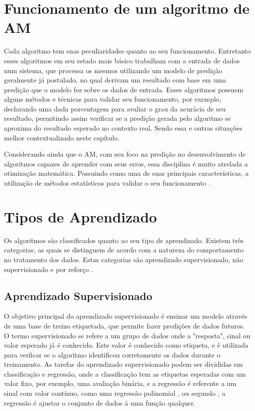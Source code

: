 \section{Funcionamento de um algoritmo de AM}
Cada algoritmo tem suas peculiaridades quanto ao seu funcionamento. Entretanto esses algoritmos em seu estado mais básico trabalham com a entrada de dados num sistema, que processa os mesmos utilizando um modelo de predição geralmente já postulado, no qual derivam um resultado com base em uma predição que o modelo fez sobre os dados de entrada. Esses algoritmos possuem alguns métodos e técnicas para validar seu funcionamento, por exemplo, declarando uma dada porcentagem para avaliar o grau da acurácia de seu resultado, permitindo assim verificar se a predição gerada pelo algoritmo se aproxima do resultado esperado no contexto real. Sendo essa e outras situações melhor contextualizado neste capítulo.

Considerando ainda que o AM, com seu foco na predição no desenvolvimento de algoritmos capazes de aprender com seus erros, essa disciplina é muito atrelada a otimização matemática. Possuindo como uma de suas principais características, a utilização de métodos estatísticos para validar o seu funcionamento \cite{trevor2009elements}.

\section{Tipos de Aprendizado}
Os algoritmos são classificados quanto ao seu tipo de aprendizado. Existem três categorias, as quais se distinguem de acordo com a natureza do comportamento no tratamento dos dados. Estas categorias são aprendizado supervisionado, não supervisionado e por reforço \cite{geron2017hands}.
 
\subsection{Aprendizado Supervisionado}
O objetivo principal do aprendizado supervisionado é ensinar um modelo através de uma base de treino etiquetada, que permite fazer predições de dados futuros. O termo supervisionado se refere a um grupo de dados onde a "resposta", sinal ou valor esperado já é conhecido. Este valor é conhecido como etiqueta, e é utilizada para verficar se o algoritmo identificou corretamente os dados durante o treinamento. As tarefas do aprendizado supervisionado podem ser divididas em classificação e regressão, onde a classificação tem as etiquetas esperadas com um valor fixo, por exemplo, uma avaliação binária, e a regressão é referente a um sinal com valor contínuo, como uma regressão polinomial \cite{geron2017hands}, ou segundo \cite{kirk2014thoughtful}, a regressão é ajustar o conjunto de dados á uma função qualquer.

